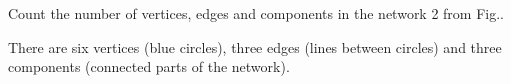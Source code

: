 Count the number of vertices, edges and components in the network 2 from Fig.. 

\solution
There are six vertices (blue circles), three edges (lines between circles) and three components (connected parts of the network). 

